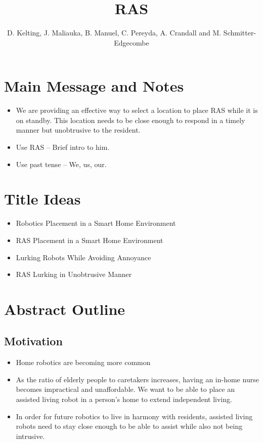 \documentclass[11pt, conference, a4paper]{IEEEtran}
\author{D. Kelting, J. Maliauka, B. Manuel, C. Pereyda, A. Crandall and M. Schmitter-Edgecombe}
\title{RAS}
\begin{document}
\maketitle


\section{Main Message and Notes}
\begin{itemize}
	\item We are providing an effective way to select a location to place RAS while it is on standby. This location needs to be close enough to respond in a timely manner but unobtrusive to the resident.
	\item Use RAS -- Brief intro to him.
	\item Use past tense -- We, us, our.
\end{itemize}


\section{Title Ideas}
\begin{itemize}
	\item Robotics Placement in a Smart Home Environment
	\item RAS Placement in a Smart Home Environment 
	\item Lurking Robots While Avoiding Annoyance
	\item RAS Lurking in Unobtrusive Manner
	
\end{itemize}


\section{Abstract Outline}


\subsection{Motivation}
\begin{itemize}
    \item Home robotics are becoming more common
    \item As the ratio of elderly people to caretakers increases, having an 
        in-home nurse becomes impractical and unaffordable. We want to be able to place an assisted living robot 
        in a person's home to extend independent living.
    \item In order for future robotics to live in harmony with residents, assisted living robots need to stay close enough to be able to assist while also not being intrusive. 
\end{itemize}
\end{document}
